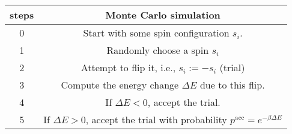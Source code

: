 \begin{tabular}{c || c}
	\textbf{steps} &\textbf{Monte Carlo simulation} \\
	\hline
	0 &Start with some spin configuration {$s_i$}.\\
	\hline
	1 &Randomly choose a spin $s_i$ \\
	\hline
	2 &Attempt to flip it, i.e., $s_i:= -s_i$ (trial)\\
	\hline
	3 &Compute the energy change $\Delta E$ due to this flip. \\
	\hline
	4 &If $\Delta E < 0$, accept the trial. \\
	\hline
	5 &If $\Delta E > 0$, accept the trial with probability $p^{\mathrm{acc}}=e^{-\beta \Delta E}$\\
\end{tabular}
